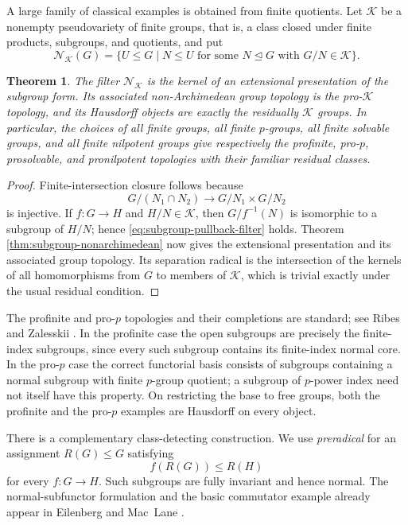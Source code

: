 \documentclass[12pt,oneside,reqno]{amsart}
\newtheorem{theorem}{Theorem}[section]
\theoremstyle{definition}
\theoremstyle{remark}
\begin{document}
A large family of classical examples is obtained from finite
quotients.  Let \(\mathcal K\) be a nonempty pseudovariety of finite
groups, that is, a class closed under finite products, subgroups, and
quotients, and put
\[
 \mathcal N_{\mathcal K}(G)=
 \{U\leqslant G\mid
   N\leqslant U\text{ for some }N\mathrel{\trianglelefteq}G
   \text{ with }G/N\in\mathcal K\}.
\]

\begin{theorem}\label{thm:pro-K-topology}
The filter \(\mathcal N_{\mathcal K}\) is the kernel of an extensional
presentation of the subgroup form.  Its associated non-Archimedean group topology is
the pro-\(\mathcal K\) topology, and its Hausdorff objects are exactly
the residually \(\mathcal K\) groups.  In particular, the choices of
all finite groups, all finite \(p\)-groups, all finite solvable groups,
and all finite nilpotent groups give respectively the profinite,
pro-\(p\), prosolvable, and pronilpotent topologies with their familiar
residual classes.
\end{theorem}

\begin{proof}
Finite-intersection closure follows because
\[
 G/(N_1\cap N_2)\longrightarrow G/N_1\times G/N_2
\]
is injective.  If \(f:G\to H\) and \(H/N\in\mathcal K\), then
\(G/f^{-1}(N)\) is isomorphic to a subgroup of \(H/N\); hence
\eqref{eq:subgroup-pullback-filter} holds.  Theorem
\ref{thm:subgroup-nonarchimedean} now gives the extensional
presentation and its associated group topology.  Its
separation radical is the intersection of the kernels of all
homomorphisms from \(G\) to members of \(\mathcal K\), which is trivial
exactly under the usual residual condition.
\end{proof}

The profinite and pro-\(p\) topologies and their completions are
standard; see Ribes and Zalesskii \cite{RibesZalesskii}.  In the
profinite case the open subgroups are precisely the finite-index
subgroups, since every such subgroup contains its finite-index normal
core.  In the pro-\(p\) case the correct functorial basis consists of
subgroups containing a normal subgroup with finite \(p\)-group
quotient; a subgroup of \(p\)-power index need not itself have this
property.  On restricting the base to free groups, both the profinite
and the pro-\(p\) examples are Hausdorff on every object.

There is a complementary class-detecting construction.  We use
\emph{preradical} for an assignment
\(R(G)\leqslant G\) satisfying
\begin{equation}\label{eq:functorial-subgroup}
                         f(R(G))\leqslant R(H)
\end{equation}
for every \(f:G\to H\).  Such subgroups are fully invariant and hence
normal.  The normal-subfunctor formulation and the basic commutator
example already appear in Eilenberg and Mac~Lane
\cite[Section~16]{EilenbergMacLane}.
\end{document}
